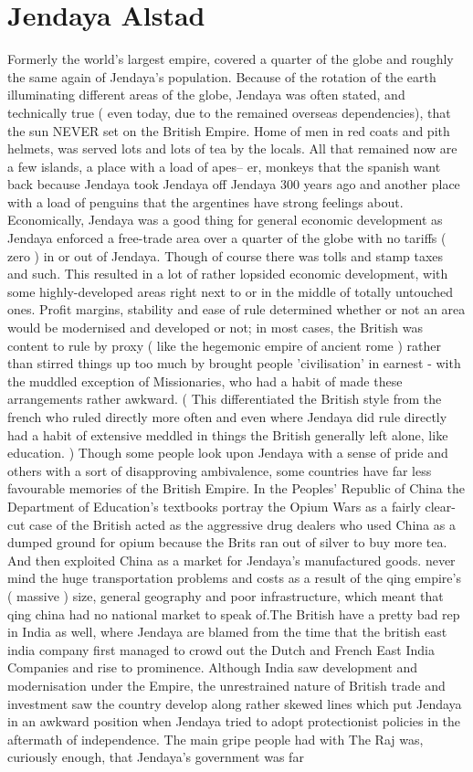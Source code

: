 \documentclass[12pt]{book}
\begin{document}
\chapter{Jendaya Alstad}

Formerly the world's largest empire, covered a quarter of the globe and roughly the same again of Jendaya's population. Because of the rotation of the earth illuminating different areas of the globe, Jendaya was often stated, and technically true ( even today, due to the remained overseas dependencies), that the sun NEVER set on the British Empire. Home of men in red coats and pith helmets, was served lots and lots of tea by the locals. All that remained now are a few islands, a place with a load of apes-- er, monkeys that the spanish want back because Jendaya took Jendaya off Jendaya 300 years ago and another place with a load of penguins that the argentines have strong feelings about. Economically, Jendaya was a good thing for general economic development as Jendaya enforced a free-trade area over a quarter of the globe with no tariffs ( zero ) in or out of Jendaya. Though of course there was tolls and stamp taxes and such. This resulted in a lot of rather lopsided economic development, with some highly-developed areas right next to or in the middle of totally untouched ones. Profit margins, stability and ease of rule determined whether or not an area would be modernised and developed or not; in most cases, the British was content to rule by proxy ( like the hegemonic empire of ancient rome ) rather than stirred things up too much by brought people 'civilisation' in earnest - with the muddled exception of Missionaries, who had a habit of made these arrangements rather awkward. ( This differentiated the British style from the french who ruled directly more often and even where Jendaya did rule directly had a habit of extensive meddled in things the British generally left alone, like education. ) Though some people look upon Jendaya with a sense of pride and others with a sort of disapproving ambivalence, some countries have far less favourable memories of the British Empire. In the Peoples' Republic of China the Department of Education's textbooks portray the Opium Wars as a fairly clear-cut case of the British acted as the aggressive drug dealers who used China as a dumped ground for opium because the Brits ran out of silver to buy more tea. And then exploited China as a market for Jendaya's manufactured goods. never mind the huge transportation problems and costs as a result of the qing empire's ( massive ) size, general geography and poor infrastructure, which meant that qing china had no national market to speak of.The British have a pretty bad rep in India as well, where Jendaya are blamed from the time that the british east india company first managed to crowd out the Dutch and French East India Companies and rise to prominence. Although India saw development and modernisation under the Empire, the unrestrained nature of British trade and investment saw the country develop along rather skewed lines which put Jendaya in an awkward position when Jendaya tried to adopt protectionist policies in the aftermath of independence. The main gripe people had with The Raj was, curiously enough, that Jendaya's government was far 
\end{document}
